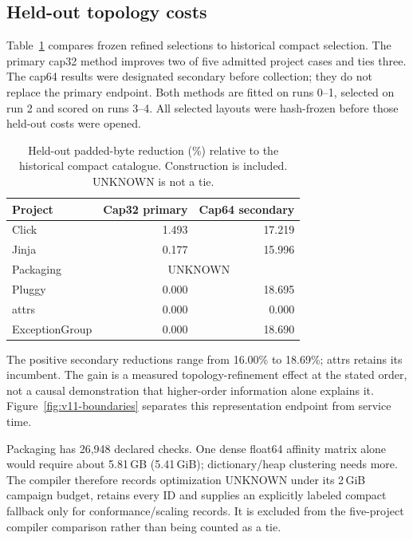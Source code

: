 \documentclass[10pt,journal,compsoc]{IEEEtran}
\theoremstyle{definition}\newtheorem{definition}[theorem]{Definition}
\begin{document}
\subsection{Held-out topology costs}
Table~\ref{tab:v11-gains} compares frozen refined selections to historical
compact selection. The primary cap32 method improves two of five admitted
project cases and ties three. The cap64 results were designated secondary
before collection; they do not replace the primary endpoint. Both methods
are fitted on runs 0--1, selected on run 2 and scored on runs 3--4.
All selected layouts were hash-frozen before those held-out costs were opened.
\begin{table}[t]\centering\footnotesize
\caption{Held-out padded-byte reduction (\%) relative to the historical
compact catalogue. Construction is included. UNKNOWN is not a tie.}
\label{tab:v11-gains}
\begin{tabular}{@{}lrr@{}}\toprule
Project & Cap32 primary & Cap64 secondary\\\midrule
Click & 1.493 & 17.219 \\
Jinja & 0.177 & 15.996 \\
Packaging & \multicolumn{2}{c}{UNKNOWN} \\
Pluggy & 0.000 & 18.695 \\
attrs & 0.000 & 0.000 \\
ExceptionGroup & 0.000 & 18.690 \\
\bottomrule\end{tabular}
\end{table}

The positive secondary reductions range from 16.00\% to 18.69\%; attrs
retains its incumbent. The gain is a measured topology-refinement effect
at the stated order, not a causal demonstration that higher-order information
alone explains it. Figure~\ref{fig:v11-boundaries} separates this representation
endpoint from service time.

Packaging has 26,948 declared checks. One dense float64 affinity matrix
alone would require about 5.81\,GB (5.41\,GiB); dictionary/heap clustering
needs more. The compiler therefore records optimization UNKNOWN under its
2\,GiB campaign budget, retains every ID and supplies an explicitly labeled
compact fallback only for conformance/scaling records. It is excluded from
the five-project compiler comparison rather than being counted as a tie.
\end{document}
